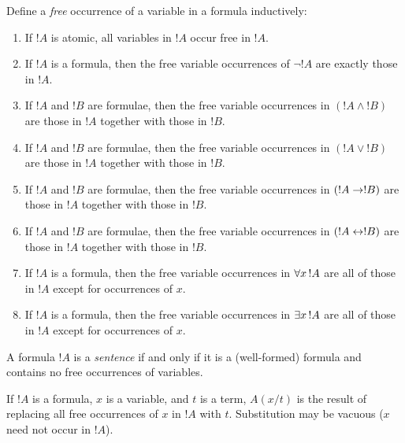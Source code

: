 \documentclass[syntax-and-semantics]{subfiles}
\begin{document}
\begin{defn}
Define a \emph{free} occurrence of a variable in a formula inductively:
\begin{enumerate}
\item If $!A$ is atomic, all variables in $!A$ occur free in $!A$.
\item If $!A$ is a formula, then the free variable occurrences of
  $\lnot !A$ are exactly those in $!A$.
\item If $!A$ and $!B$ are formulae, then the free variable
  occurrences in $(!A \land !B)$ are those in $!A$ together with those
  in $!B$.
\item If $!A$ and $!B$ are formulae, then the free variable
  occurrences in $(!A \lor !B)$ are those in $!A$ together with those
  in $!B$.
\item If $!A$ and $!B$ are formulae, then the free variable
  occurrences in $(!A \to !B)$ are those in $!A$ together with those
  in $!B$.
\item If $!A$ and $!B$ are formulae, then the free variable
  occurrences in $(!A \leftrightarrow !B)$ are those in $!A$ together with those
  in $!B$.
\item If $!A$ is a formula, then the free variable occurrences in
  $\lforall[x][!A]$ are all of those in $!A$ except for occurrences of
  $x$.
\item If $!A$ is a formula, then the free variable occurrences in
  $\lexists[x][!A]$ are all of those in $!A$ except for occurrences of
  $x$.
\end{enumerate}
\end{defn}

\begin{defn}[Sentence]
A formula $!A$ is a \emph{sentence} if and only if it is a
(well-formed) formula and contains no free occurrences of variables.
\end{defn}


\begin{defn}
If $!A$ is a formula, $x$ is a variable, and $t$ is a term, $A(x/t)$
is the result of replacing all free occurrences of $x$ in $!A$ with
$t$. Substitution may be vacuous ($x$ need not occur in $!A$).
\end{defn}
\end{document}
